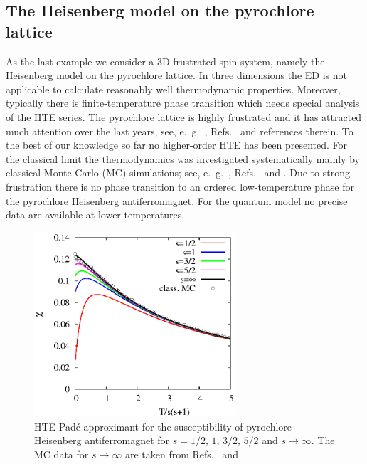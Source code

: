 \documentclass[aps,twocolumn,groupedaddress]{revtex4}
\begin{document}
\subsection{The Heisenberg model on the pyrochlore lattice}

As the last example we consider a 3D frustrated spin system, namely
the Heisenberg model on the pyrochlore lattice. In three dimensions the ED is not
applicable to calculate reasonably well thermodynamic properties. Moreover,
typically there is finite-temperature phase transition which needs special
analysis of the HTE series.
The pyrochlore lattice is highly frustrated and it has attracted much attention over
the last years, see, e.~g.~, Refs.~ and references
therein.
To the best of our knowledge so far no higher-order HTE has been presented.
For the classical limit the thermodynamics was investigated systematically
mainly by classical Monte Carlo (MC)  simulations; see, e.~g.~,
Refs.~ and .  Due to strong
frustration there is no phase transition to an ordered low-temperature phase for the
pyrochlore Heisenberg antiferromagnet.
For the quantum model no precise data are available at lower temperatures.

\begin{figure}
\begin{center}
\includegraphics[clip=on,width=75mm,angle=0]{fig8.eps}
\end{center}
\caption{HTE Pad\'e approximant for
the susceptibility of pyrochlore Heisenberg
antiferromagnet for $s=1/2$, $1$, $3/2$, $5/2$ and $s \to \infty$.
The MC data  for $s \to \infty$ are taken from
Refs.~ and .
}
\label{fig_pyro}
\end{figure}
\end{document}

